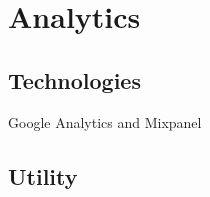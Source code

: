 \section{Analytics}
\label{sec:analytics}

\subsection{Technologies}
\label{ssec:analyticsTech}

Google Analytics and Mixpanel

\subsection{Utility}
\label{ssec:utility}
